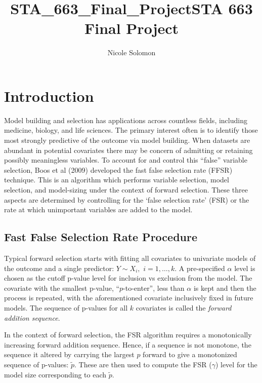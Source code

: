 \documentclass{article}
\title{STA\_663\_Final\_Project}
\begin{document}
    \title{STA 663 Final Project}
    \author{Nicole Solomon}
    \maketitle
    
    

    
    \section{Introduction}\label{introduction}

Model building and selection has applications across countless fields,
including medicine, biology, and life sciences. The primary interest
often is to identify those most strongly predictive of the outcome via
model building. When datasets are abundant in potential covariates there
may be concern of admitting or retaining possibly meaningless variables.
To account for and control this ``false'' variable selection, Boos et al
(2009) developed the fast false selection rate (FFSR) technique. This is
an algorithm which performs variable selection, model selection, and
model-sizing under the context of forward selection. These three aspects
are determined by controlling for the `false selection rate' (FSR) or
the rate at which unimportant variables are added to the model.

    \subsection{Fast False Selection Rate
Procedure}\label{fast-false-selection-rate-procedure}

Typical forward selection starts with fitting all covariates to
univariate models of the outcome and a single predictor: $Y \sim X_i,$
$i = 1,\ldots,k$. A pre-specified $\alpha$ level is chosen as the cutoff
p-value level for inclusion vs exclusion from the model. The covariate
with the smallest p-value, ``$p$-to-enter'', less than $\alpha$ is kept
and then the process is repeated, with the aforementioned covariate
inclusively fixed in future models. The sequence of p-values for all $k$
covariates is called the \textit{forward addition sequence}.

In the context of forward selection, the FSR algorithm requires a
monotonically increasing forward addition sequence. Hence, if a sequence
is not monotone, the sequence it altered by carrying the largest $p$
forward to give a monotonized sequence of p-values: $\tilde{p}.$ These
are then used to compute the FSR ($\gamma$) level for the model size
corresponding to each $\tilde{p}.$
\end{document}
